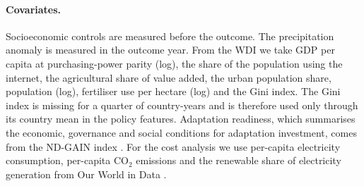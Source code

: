 \paragraph{Covariates.} Socioeconomic controls are measured before the outcome. The precipitation
anomaly is measured in the outcome year. From the WDI \citep{wdi2026} we take GDP per capita at purchasing-power parity (log), the
share of the population using the internet, the agricultural share of value added, the urban
population share, population (log), fertiliser use per hectare (log) and the Gini index. The Gini
index is missing for a quarter of country-years and is therefore used only through its country
mean in the policy features. Adaptation readiness, which summarises the economic, governance and
social conditions for adaptation investment, comes from the ND-GAIN index \citep{chen2015ndgain}.
For the cost analysis we use per-capita electricity consumption, per-capita CO$_2$ emissions and
the renewable share of electricity generation from Our World in Data \citep{owid2026}.



